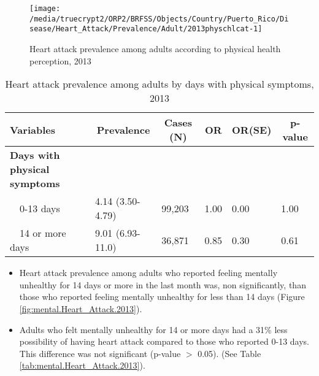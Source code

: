 \begin{figure}[H]
\caption{Heart attack prevalence among adults according to physical health perception, 2013}
\label{fig:phys.Heart_Attack.2013}
\begin{knitrout}
\color{fgcolor}

{\centering \texttt{[image: /media/truecrypt2/ORP2/BRFSS/Objects/Country/Puerto\_Rico/Disease/Heart\_Attack/Prevalence/Adult/2013physchlcat-1]} 

}



\end{knitrout}
 \end{figure}

\begin{table}[H]
\caption{Heart attack prevalence among adults by days with physical symptoms, 2013\label{tab:phys.Heart_Attack.2013}} 
\begin{center}
\begin{tabular}{llllll}
\hline\hline
\multicolumn{1}{l}{Variables}&\multicolumn{1}{c}{Prevalence}&\multicolumn{1}{c}{Cases (N)}&\multicolumn{1}{c}{OR}&\multicolumn{1}{c}{OR(SE)}&\multicolumn{1}{c}{p-value}\tabularnewline
\hline
{\bfseries Days with physical symptoms}&&&&&\tabularnewline
~~0-13 days&4.14 (3.50-4.79)&99,203&1.00&0.00&1.00\tabularnewline
~~14 or more days&9.01 (6.93-11.0)&36,871&0.85&0.30&0.61\tabularnewline
\hline
\end{tabular}\end{center}

\end{table}


 \newpage
\begin{itemize}

\item Heart attack prevalence among adults who reported feeling mentally unhealthy for 14 days or more in the last month was, non significantly,  than those who reported feeling mentally unhealthy for less than 14 days (Figure \ref{fig:mental.Heart_Attack.2013}).


\item  Adults who felt mentally unhealthy for 14 or more days had a 31\% less possibility of having heart attack compared to those who reported 0-13 days. This difference was not significant (p-value $>$ 0.05). (See Table \ref{tab:mental.Heart_Attack.2013}).

\end{itemize}

